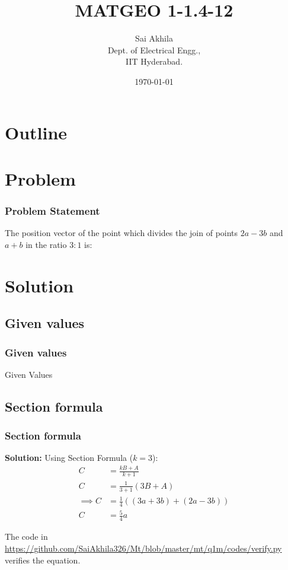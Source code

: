 \documentclass{beamer}
\title{MATGEO 1-1.4-12}
\author{Sai Akhila\\ Dept. of Electrical Engg.,\\IIT Hyderabad.}
\date{\today}
\providecommand{\brak}[1]{\ensuremath{\left(#1\right)}}
\theoremstyle{remark}
\renewcommand{\solution}[1]{\textbf{Solution:} #1} %
\numberwithin{equation}{section}
\begin{document}
\begin{frame}
\titlepage
\end{frame}

\section*{Outline}
\begin{frame}
\tableofcontents
\end{frame}

\section{Problem}
\begin{frame}
\frametitle{Problem Statement}
The position vector of the point which divides the join of points \(2a-3b\) and \(a + b\) in the ratio \(3:1\) is:
\end{frame}

\section{Solution}
\subsection{Given values}
\begin{frame}
\frametitle{Given values}
\begin{table}[h]
    \centering
    
    \caption{Given Values}
    \label{tab:1}
\end{table}
\end{frame}

\subsection{Section formula}
\begin{frame}
\frametitle{Section formula}
\solution{
Using Section Formula (\(k=3\)):
\begin{align}
	C &= \frac{kB+A}{k+1} \\
	C &= \frac{1}{3+1} \brak{3B + A} \\
    \implies	C &= \frac{1}{4}\brak{ \brak{3a + 3b} + \brak{2a - 3b}} \\
	C &= \frac{5}{4} a
\end{align}
}
\end{frame}

\begin{frame}
    The code in 
    {\footnotesize
    \url{https://github.com/SaiAkhila326/Mt/blob/master/mt/q1m/codes/verify.py}
    }
    verifies the equation.
\end{frame}
\end{document}
